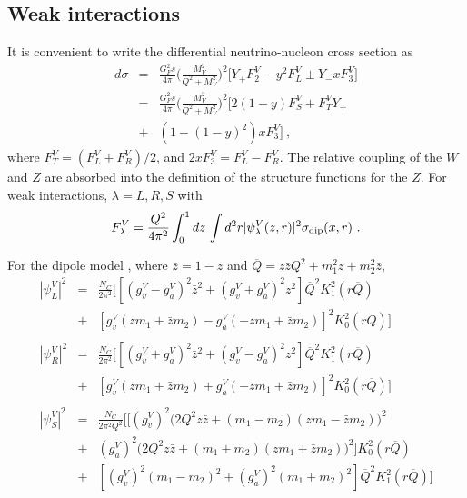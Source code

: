 \documentclass[aps,10pt,twocolumn,tightenlines]{revtex4-1}
\newcommand{\Qbar}{\overline{Q}}
\begin{document}
\begin{appendix}
\section{Weak interactions}

It is convenient to write the differential neutrino-nucleon cross section as
\begin{eqnarray}
\nonumber
d\sigma&=&\frac{G_F^2 s}{4\pi}\Biggl(\frac{M_V^2}{Q^2+M_V^2}\Biggr)^2
\Biggl[ Y_+ F_2^V - y^2 F_L^V\pm Y_- xF_3^V\Biggr]\\
\nonumber
&=& \frac{G_F^2 s}{4\pi}\Biggl(\frac{M_V^2}{Q^2+M_V^2}\Biggr)^2
\Biggl[ 2(1-y)F_S ^V+ F_T ^VY_+ 
\\
&+ &(1-(1-y)^2 )x F_3^V\Biggr]\ ,
\end{eqnarray}
where $F_T^V=(F_L^V+F_R^V)/2$,  and  $2xF_3 ^V= F_L^V-F_R^V$. The relative coupling of the $W$ and $Z$ are absorbed into the definition of
the structure functions for the $Z$.
For weak interactions, $\lambda = L,R,S$ with
\begin{equation}
F_\lambda^V = \frac{Q^2}{4\pi^2} \int_0^1dz\, \int d^2 r|\psi_\lambda^V(z,r)|^2 \sigma_{\rm dip}(x,r)\ .
\end{equation}

For the dipole model \cite{Fiore:2011gx,Barone:1993es,Kutak:2003bd,Arguelles:2015wba},
where $\bar{z} = 1-z$ and $\Qbar = z\bar{z}Q^2 + m_1 ^2 z + m_2^2 \bar{z}$,
\begin{eqnarray}
\nonumber
|\psi_L^V|^2 &=& \frac{N_C}{2\pi^2}\Biggl[ [(g_v^V-g_a^V)^2 \bar{z}^2 + (g_v^V+g_a^V)^2 z^2]\Qbar^2 K_1^2(r\Qbar)\\
\nonumber
       &+& [g_v^V(zm_1+\bar{z}m_2)- g_a^V(-z m_1+\bar{z}m_2)]^2 K_0^2(r\Qbar)\Biggr]\\
\nonumber \\ \nonumber
|\psi_R^V|^2 &=& \frac{N_C}{2\pi^2}\Biggl[ [(g_v^V+g_a^V)^2 \bar{z}^2 + (g_v^V-g_a^V)^2 z^2]\Qbar^2 K_1^2(r\Qbar)\\
\nonumber
       &+& [g_v^V(zm_1+\bar{z}m_2)+ g_a^V(-z m_1+\bar{z}m_2)]^2 K_0^2(r\Qbar)\Biggr]   \\
\nonumber \\ \nonumber
|\psi_S^V|^2 &=& \frac{N_C}{2\pi^2Q^2 }\Biggl[ [ (g_v^V)^2\bigl(2Q^2 z\bar{z} +(m_1-m_2)(zm_1-\bar{z}m_2)\bigr)^2\\
\nonumber
&+&(g_a^V)^2 \bigl( 2Q^2 z\bar{z} +(m_1+m_2)(zm_1+\bar{z}m_2)\bigr)^2]K_0^2(r\Qbar)\\
\nonumber
       &+& [(g_v^V)^2(m_1-m_2)^2+(g_a^V)^2(m_1+m_2)^2] \Qbar^2 K_1^2(r\Qbar)\Biggr]    \\
\end{eqnarray}



\end{appendix}
\end{document}
